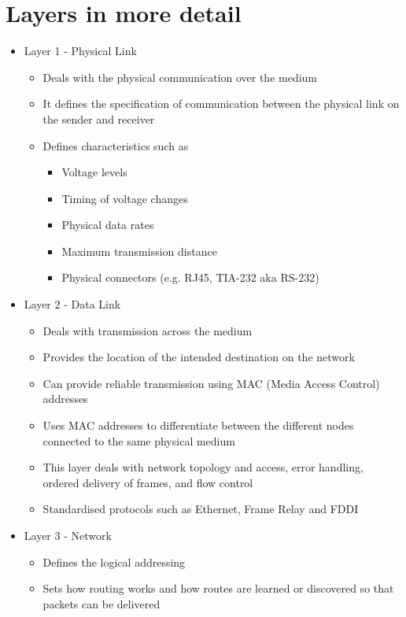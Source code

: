 \section*{Layers in more detail}

\begin{itemize}
  \item Layer 1 - Physical Link
  \begin{itemize}
    \item Deals with the physical communication over the medium
    \item It defines the specification of communication between the physical link on the sender and receiver
    \item Defines characteristics such as 
    \begin{itemize}
      \item Voltage levels
      \item Timing of voltage changes
      \item Physical data rates
      \item Maximum transmission distance
      \item Physical connectors (e.g. RJ45, TIA-232 aka RS-232)
    \end{itemize}
  \end{itemize}
  \item Layer 2 - Data Link
  \begin{itemize}
    \item Deals with transmission across the medium
    \item Provides the location of the intended destination on the network
    \item Can provide reliable transmission using MAC (Media Access Control) addresses
    \item Uses MAC addresses to differentiate between the different nodes connected to the same physical medium
    \item This layer deals with network topology and access, error handling, ordered delivery of frames, and flow control
    \item Standardised protocols such as Ethernet, Frame Relay and FDDI
  \end{itemize}
  \item Layer 3 - Network
  \begin{itemize}
    \item Defines the logical addressing
    \item Sets how routing works and how routes are learned or discovered so that packets can be delivered

\end{itemize}
\end{itemize}
